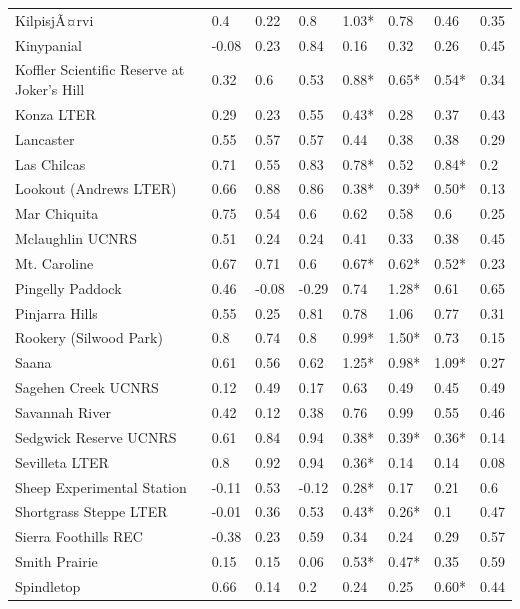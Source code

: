 \documentclass[twoside,12pt,final]{ucthesis-CA2012}
\begin{document}
\begin{ucmainmatter}
\begin{table}[ht]
{\begin{tabular}{llllllll}
  KilpisjÃ¤rvi & 0.4 & 0.22 & 0.8 & 1.03* & 0.78 & 0.46 & 0.35 \\ 
  Kinypanial & -0.08 & 0.23 & 0.84 & 0.16 & 0.32 & 0.26 & 0.45 \\ 
  Koffler Scientific Reserve at Joker's Hill & 0.32 & 0.6 & 0.53 & 0.88* & 0.65* & 0.54* & 0.34 \\ 
  Konza LTER & 0.29 & 0.23 & 0.55 & 0.43* & 0.28 & 0.37 & 0.43 \\ 
  Lancaster & 0.55 & 0.57 & 0.57 & 0.44 & 0.38 & 0.38 & 0.29 \\ 
  Las Chilcas & 0.71 & 0.55 & 0.83 & 0.78* & 0.52 & 0.84* & 0.2 \\ 
  Lookout (Andrews LTER) & 0.66 & 0.88 & 0.86 & 0.38* & 0.39* & 0.50* & 0.13 \\ 
  Mar Chiquita & 0.75 & 0.54 & 0.6 & 0.62 & 0.58 & 0.6 & 0.25 \\ 
  Mclaughlin UCNRS & 0.51 & 0.24 & 0.24 & 0.41 & 0.33 & 0.38 & 0.45 \\ 
  Mt. Caroline & 0.67 & 0.71 & 0.6 & 0.67* & 0.62* & 0.52* & 0.23 \\ 
  Pingelly Paddock & 0.46 & -0.08 & -0.29 & 0.74 & 1.28* & 0.61 & 0.65 \\ 
  Pinjarra Hills & 0.55 & 0.25 & 0.81 & 0.78 & 1.06 & 0.77 & 0.31 \\ 
  Rookery (Silwood Park) & 0.8 & 0.74 & 0.8 & 0.99* & 1.50* & 0.73 & 0.15 \\ 
  Saana & 0.61 & 0.56 & 0.62 & 1.25* & 0.98* & 1.09* & 0.27 \\ 
  Sagehen Creek UCNRS & 0.12 & 0.49 & 0.17 & 0.63 & 0.49 & 0.45 & 0.49 \\ 
  Savannah River & 0.42 & 0.12 & 0.38 & 0.76 & 0.99 & 0.55 & 0.46 \\ 
  Sedgwick Reserve UCNRS & 0.61 & 0.84 & 0.94 & 0.38* & 0.39* & 0.36* & 0.14 \\ 
  Sevilleta LTER & 0.8 & 0.92 & 0.94 & 0.36* & 0.14 & 0.14 & 0.08 \\ 
  Sheep Experimental Station & -0.11 & 0.53 & -0.12 & 0.28* & 0.17 & 0.21 & 0.6 \\ 
  Shortgrass Steppe LTER & -0.01 & 0.36 & 0.53 & 0.43* & 0.26* & 0.1 & 0.47 \\ 
  Sierra Foothills REC & -0.38 & 0.23 & 0.59 & 0.34 & 0.24 & 0.29 & 0.57 \\ 
  Smith Prairie & 0.15 & 0.15 & 0.06 & 0.53* & 0.47* & 0.35 & 0.59 \\ 
  Spindletop & 0.66 & 0.14 & 0.2 & 0.24 & 0.25 & 0.60* & 0.44 \\ 

\end{tabular}}
\end{table}
\end{ucmainmatter}
\end{document}

